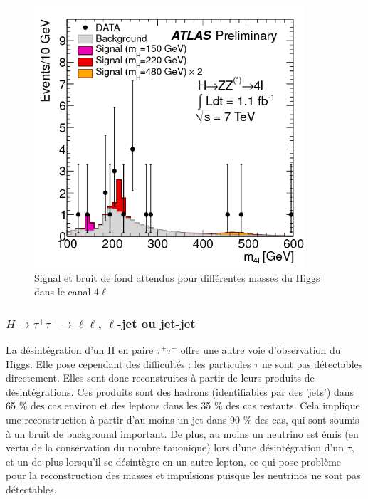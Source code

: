 \documentclass[11pt]{article} %
\begin{document}
\begin{figure}[H]
\centering
  \caption{Signal et bruit de fond attendus pour différentes masses du Higgs dans le canal $4\ell$}
 \includegraphics[width=0.9\textwidth]{../images/atlas_llll_events.png}
\end{figure}


\subsubsection{$H \to \tau^+ \tau^- \to \ell\ell$, $\ell$-jet ou jet-jet}

La désintégration d'un H en paire $\tau^+ \tau^-$ offre une autre voie d'observation du Higgs. Elle pose cependant des difficultés : les particules $\tau$ ne sont pas détectables directement. Elles sont donc reconstruites à partir de leurs produits de désintégrations. Ces produits sont des hadrons (identifiables par des 'jets') dans 65 \% des cas environ et des leptons dans les 35 \% des cas restants. Cela implique une reconstruction à partir d'au moins un jet dans 90  \% des cas, qui sont soumis à un bruit de  background important. De plus, au moins un neutrino est émis (en vertu de la conservation du nombre tauonique) lors d'une désintégration d'un $\tau$, et un de plus lorsqu'il se désintègre en un autre lepton, ce qui pose problème pour la reconstruction des masses et impulsions puisque les neutrinos ne sont pas détectables.
\end{document}
